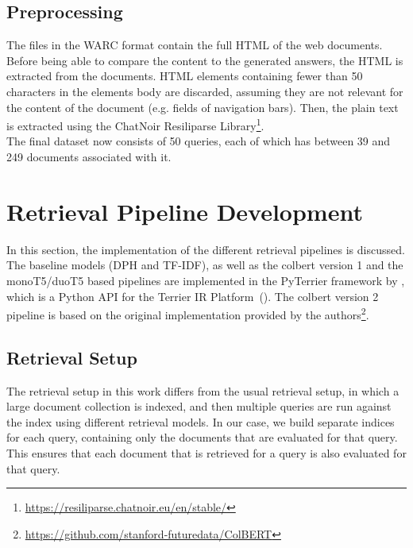 \subsection{Preprocessing}
The files in the WARC format contain the full HTML of the web documents.
Before being able to compare the content to the generated answers, the HTML is extracted from the documents.
HTML elements containing fewer than 50 characters in the elements body are discarded, assuming they are not relevant for the content of the document (e.g. fields of navigation bars).
Then, the plain text is extracted using the ChatNoir Resiliparse Library\footnote{\url{https://resiliparse.chatnoir.eu/en/stable/}}.
\\
The final dataset now consists of 50 queries, each of which has between 39 and 249 documents associated with it.


\section{Retrieval Pipeline Development}
In this section, the implementation of the different retrieval pipelines is discussed.
The baseline models (DPH and TF-IDF), as well as the colbert version 1 and the monoT5/duoT5 based pipelines are implemented in the PyTerrier framework by \cite{pyterrier:2020}, which is a Python API for the Terrier IR Platform~(\cite{macdonald:2012}).
The colbert version 2 pipeline is based on the original implementation provided by the authors\footnote{\url{https://github.com/stanford-futuredata/ColBERT}}.

\subsection{Retrieval Setup}
The retrieval setup in this work differs from the usual retrieval setup, in which a large document collection is indexed, and then multiple queries are run against the index using different retrieval models.
In our case, we build separate indices for each query, containing only the documents that are evaluated for that query.
This ensures that each document that is retrieved for a query is also evaluated for that query.

